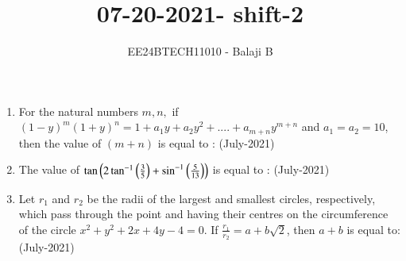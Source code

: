 \documentclass[journal]{IEEEtran}
\begin{document}

\vspace{3cm}

\title{07-20-2021- shift-2}
\author{EE24BTECH11010 - Balaji B}
{\let\newpage\relax\maketitle}
 \begin{enumerate}
    \item For the natural numbers $m,n,$ if $(1-y)^m (1+y)^n = 1 + a_1y + a_2 y^2 + .... + a_{m+n} y^{m+n}$ and $a_1 = a_2 = 10 $, then the value of $(m+n)$ is equal to : \hfill (July-2021)
    \begin{enumerate}
    \end{enumerate}
    \item The value of $\tan\left(2\tan^{-1}\left(\frac{3}{5}\right)+ \sin^{-1}\left(\frac{5}{13}\right)\right)$ is equal to : \hfill (July-2021)
    \begin{enumerate}
    \end{enumerate}
    \item  Let $r_1$ and $r_2$ be the radii of the largest and smallest circles, respectively, which pass through the point  and having their centres on the circumference of the circle $x^2 + y^2 + 2x + 4y - 4 = 0$. If $\frac{r_1}{r_2} = a + b\sqrt{2} $, then $a+b$ is equal to: \hfill (July-2021)
    \begin{enumerate}
\end{enumerate}
\end{enumerate}
\end{document}
